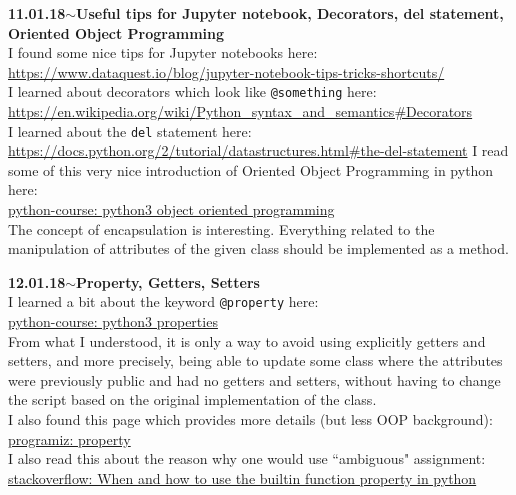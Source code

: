 \documentclass[11pt,a4paper]{article}
\newenvironment{loggentry}[2]%
{\noindent\textbf{#1}\hspace{1cm}$\mathbf{\sim}$\text{ }\textbf{#2}\\}{\vspace{0.5cm}}
\begin{document}
\begin{loggentry}{11.01.18}{Useful tips for Jupyter notebook, Decorators, del statement, Oriented Object Programming}
I found some nice tips for Jupyter notebooks here:\\
\url{https://www.dataquest.io/blog/jupyter-notebook-tips-tricks-shortcuts/}\\
I learned about decorators which look like \texttt{@something} here:\\
\url{https://en.wikipedia.org/wiki/Python_syntax_and_semantics#Decorators}\\
I learned about the \texttt{del} statement here:\\
\url{https://docs.python.org/2/tutorial/datastructures.html#the-del-statement}
I read some of this very nice introduction of Oriented Object Programming in python here:\\
\href{https://www.python-course.eu/python3_object_oriented_programming.php}{python-course: python3 object oriented programming}\\
The concept of encapsulation is interesting. Everything related to the manipulation of attributes of the given class should be implemented as a method.
\end{loggentry}

\begin{loggentry}{12.01.18}{Property, Getters, Setters}
I learned a bit about the keyword \texttt{@property} here:\\
\href{https://www.python-course.eu/python3_properties.php}{python-course: python3 properties}\\
From what I understood, it is only a way to avoid using explicitly getters and setters, and more precisely, being able to update some class where the attributes were previously public and had no getters and setters, without having to change the script based on the original implementation of the class.\\
I also found this page which provides more details (but less OOP background):\\
\href{https://www.programiz.com/python-programming/property}{programiz: property}\\
I also read this about the reason why one would use ``ambiguous" assignment:\\
\href{https://stackoverflow.com/questions/1554546/when-and-how-to-use-the-builtin-function-property-in-python}{stackoverflow: When and how to use the builtin function property in python}
\end{loggentry}
\end{document}
